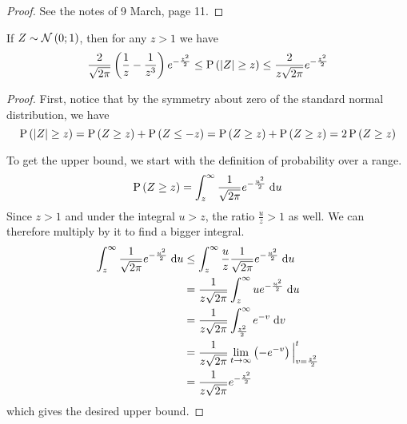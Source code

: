 \documentclass[11pt]{article}
\begin{document}
\begin{proof}
    See the notes of 9 March, page 11.
\end{proof}

\begin{lem}
    If $Z \sim \operatorname{\mathcal{N}}\left(0;1\right)$, then for any $z > 1$ we have
    \begin{equation*}
        \frac{2}{\sqrt{2\pi}}
        \left(\frac{1}{z} - \frac{1}{z^3}\right)
        e^{-\frac{z^2}{2}}
        \leq
        \operatorname{P}{\left(\left\lvert Z\right\rvert \geq z\right)}
        \leq
        \frac{2}{z \sqrt{2\pi}} e^{-\frac{z^2}{2}}
    \end{equation*}
\end{lem}

\begin{proof}
    First, notice that by the symmetry about zero of the standard normal
    distribution, we have
    \begin{equation*}
        \operatorname{P}{\left(\left\lvert Z\right\rvert \geq z\right)}
        = \operatorname{P}{\left(Z \geq z\right)} + \operatorname{P}{\left(Z \leq -z\right)}
        = \operatorname{P}{\left(Z \geq z\right)} + \operatorname{P}{\left(Z \geq z\right)}
        = 2 \operatorname{P}{\left(Z \geq z\right)}
    \end{equation*}

    To get the upper bound, we start with the definition of probability over a
    range.
    \begin{align*}
        \operatorname{P}{\left(Z \geq z\right)}
        = \int^{\infty}_z \frac{1}{\sqrt{2\pi}} e^{-\frac{u^2}{2}} \;\mathrm{d} u
    \end{align*}
    Since $z > 1$ and under the integral $u > z$, the ratio $\frac{u}{z} > 1$
    as well. We can therefore multiply by it to find a bigger integral.
    \newcommand{\bleh}{\ensuremath \frac{1}{\sqrt{2\pi}}}
    \newcommand{\blehz}{\ensuremath \frac{1}{z\sqrt{2\pi}}}
    \begin{align*}
        \inttoinf_z \bleh e^{-\frac{u^2}{2}} \intd u
        &\leq \inttoinf_z {
            \frac{u}{z} \bleh e^{-\frac{u^2}{2}}
        } \intd u \\
        &= \blehz \inttoinf_z u e^{-\frac{u^2}{2}} \intd u \\
        &= \blehz \inttoinf_{\frac{z^2}{2}} {
            e^{-v}
        } \intd v \\
        &= \blehz \lim_{t\to\infty} {
            \parens{-e^{-v}}\evaluated[v=\frac{z^2}{2}]{t}
        } \\
        &= \blehz e^{-\frac{z^2}{2}}
    \end{align*}
    which gives the desired upper bound.


\end{proof}
\end{document}
